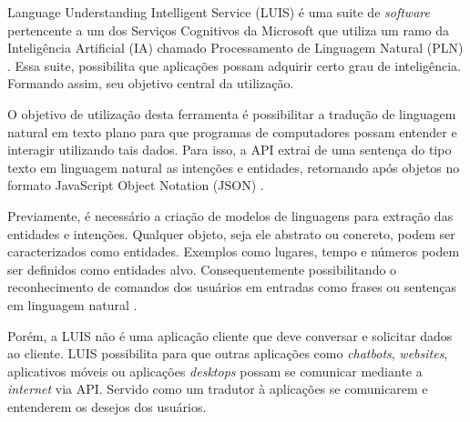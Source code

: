 Language Understanding Intelligent Service (LUIS) é uma suite de \textit{software} pertencente a um dos Serviços Cognitivos da Microsoft que utiliza um ramo da Inteligência Artificial (IA) chamado Processamento de Linguagem Natural (PLN) \cite{Mayo:2017}. Essa suite, possibilita que aplicações possam adquirir certo grau de inteligência. Formando assim, seu objetivo central da utilização.

O objetivo de utilização desta ferramenta é possibilitar a tradução de linguagem natural em texto plano para que programas de computadores possam entender e interagir utilizando tais dados. Para isso, a API extrai de uma sentença do tipo texto em linguagem natural as intenções e entidades, retornando após objetos no formato JavaScript Object Notation (JSON) \cite{Mayo:2017}.

Previamente, é necessário a criação de modelos de linguagens para extração das entidades e intenções. Qualquer objeto, seja ele abstrato ou concreto, podem ser caracterizados como entidades. Exemplos como lugares, tempo e números podem ser definidos como entidades alvo. Consequentemente possibilitando o reconhecimento de comandos dos usuários em entradas como frases ou sentenças em linguagem natural \cite{Larsen:2017}.

Porém, a LUIS não é uma aplicação cliente que deve conversar e solicitar dados ao cliente. LUIS possibilita para que outras aplicações como \textit{chatbots}, \textit{websites}, aplicativos móveis ou aplicações \textit{desktops} possam se comunicar mediante a \textit{internet} via API. Servido como um tradutor à aplicações se comunicarem e entenderem os desejos dos usuários.
